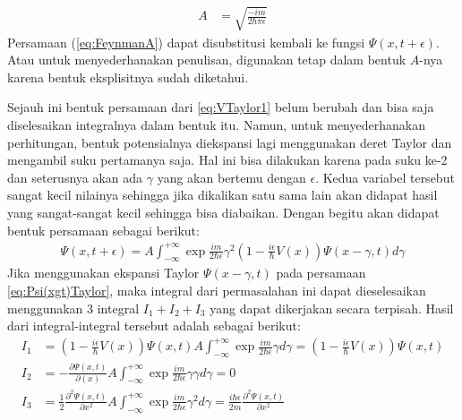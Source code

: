 \begin{align}
    A &= \sqrt{\frac{-im}{2\hbar\pi\epsilon}} \label{eq:FeynmanA}
\end{align}
Persamaan (\ref{eq:FeynmanA}) dapat disubstitusi kembali ke fungsi \(\Psi(x,t+\epsilon)\). Atau untuk menyederhanakan penulisan, digunakan tetap dalam bentuk \(A\)-nya karena bentuk eksplisitnya sudah diketahui.
\par Sejauh ini bentuk persamaan dari \ref{eq:VTaylor1} belum berubah dan bisa saja diselesaikan integralnya dalam bentuk itu. Namun, untuk menyederhanakan perhitungan, bentuk potensialnya diekspansi lagi menggunakan deret Taylor dan mengambil suku pertamanya saja. Hal ini bisa dilakukan karena pada suku ke-2 dan seterusnya akan ada \(\gamma\) yang akan bertemu dengan \(\epsilon\). Kedua variabel tersebut sangat kecil nilainya sehingga jika dikalikan satu sama lain akan didapat hasil yang sangat-sangat kecil sehingga bisa diabaikan. Dengan begitu akan didapat bentuk persamaan sebagai berikut:
\begin{align}
    \Psi(x,t+\epsilon) = A\int_{-\infty}^{+\infty}\exp{\frac{im}{2\hbar\epsilon}\gamma^2} \left(1-\frac{i\epsilon}{\hbar}V(x)\right)\Psi(x-\gamma,t)d\gamma
\end{align}
Jika menggunakan ekspansi Taylor \(\Psi(x-\gamma,t)\) pada persamaan \ref{eq:Psi(xgt)Taylor}, maka integral dari permasalahan ini dapat dieselesaikan menggunakan 3 integral \(I_1 + I_2 + I_3\) yang dapat dikerjakan secara terpisah. Hasil dari integral-integral tersebut adalah sebagai berikut:
\begin{align}
    I_1 &= \left(1 - \frac{i\epsilon}{\hbar}V(x)\right)\Psi(x,t) A\int_{-\infty}^{+\infty} \exp{\frac{im}{2\hbar\epsilon}\gamma} d\gamma =\left(1 - \frac{i\epsilon}{\hbar}V(x)\right)\Psi(x,t) \\
    I_2 &= -\frac{\partial\Psi(x,t)}{\partial(x)} A\int_{-\infty}^{+\infty} \exp{\frac{im}{2\hbar\epsilon}\gamma}\gamma d\gamma = 0 \\
    I_3 &= \frac{1}{2}\frac{\partial^2\Psi(x,t)}{\partial x^2} A\int_{-\infty}^{+\infty} \exp{\frac{im}{2\hbar\epsilon}\gamma^2}d\gamma = \frac{i\hbar\epsilon}{2m} \frac{\partial^2\Psi(x,t)}{\partial x^2} 
\end{align}

